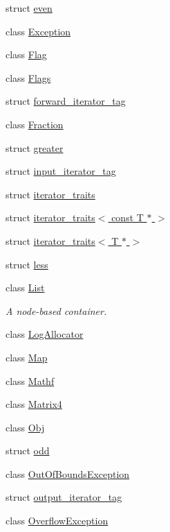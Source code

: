 \begin{DoxyCompactItemize}
struct \hyperlink{structprism_1_1even}{even}
\item 
class \hyperlink{classprism_1_1_exception}{Exception}
\item 
class \hyperlink{classprism_1_1_flag}{Flag}
\item 
class \hyperlink{classprism_1_1_flags}{Flags}
\item 
struct \hyperlink{structprism_1_1forward__iterator__tag}{forward\+\_\+iterator\+\_\+tag}
\item 
class \hyperlink{classprism_1_1_fraction}{Fraction}
\item 
struct \hyperlink{structprism_1_1greater}{greater}
\item 
struct \hyperlink{structprism_1_1input__iterator__tag}{input\+\_\+iterator\+\_\+tag}
\item 
struct \hyperlink{structprism_1_1iterator__traits}{iterator\+\_\+traits}
\item 
struct \hyperlink{structprism_1_1iterator__traits_3_01const_01_t_01_5_01_4}{iterator\+\_\+traits$<$ const T $\ast$ $>$}
\item 
struct \hyperlink{structprism_1_1iterator__traits_3_01_t_01_5_01_4}{iterator\+\_\+traits$<$ T $\ast$ $>$}
\item 
struct \hyperlink{structprism_1_1less}{less}
\item 
class \hyperlink{classprism_1_1_list}{List}
\begin{DoxyCompactList}\small\item\em A node-\/based container. \end{DoxyCompactList}\item 
class \hyperlink{classprism_1_1_log_allocator}{Log\+Allocator}
\item 
class \hyperlink{classprism_1_1_map}{Map}
\item 
class \hyperlink{classprism_1_1_mathf}{Mathf}
\item 
class \hyperlink{classprism_1_1_matrix4}{Matrix4}
\item 
class \hyperlink{classprism_1_1_obj}{Obj}
\item 
struct \hyperlink{structprism_1_1odd}{odd}
\item 
class \hyperlink{classprism_1_1_out_of_bounds_exception}{Out\+Of\+Bounds\+Exception}
\item 
struct \hyperlink{structprism_1_1output__iterator__tag}{output\+\_\+iterator\+\_\+tag}
\item 
class \hyperlink{classprism_1_1_overflow_exception}{Overflow\+Exception}
\item 

\end{DoxyCompactItemize}
